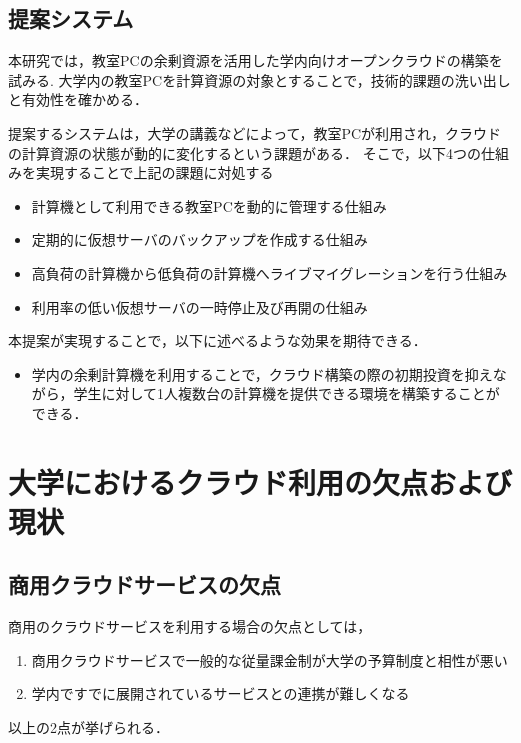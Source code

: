\documentclass[11pt,a4paper]{jsarticle}
\begin{document}
\subsection{提案システム}
本研究では，教室PCの余剰資源を活用した学内向けオープンクラウドの構築を試みる.
大学内の教室PCを計算資源の対象とすることで，技術的課題の洗い出しと有効性を確かめる．
\par 提案するシステムは，大学の講義などによって，教室PCが利用され，クラウドの計算資源の状態が動的に変化するという課題がある．
そこで，以下4つの仕組みを実現することで上記の課題に対処する
\begin{itemize}
	\item 計算機として利用できる教室PCを動的に管理する仕組み
	\item 定期的に仮想サーバのバックアップを作成する仕組み
	\item 高負荷の計算機から低負荷の計算機へライブマイグレーションを行う仕組み
	\item 利用率の低い仮想サーバの一時停止及び再開の仕組み
\end{itemize}

\par 本提案が実現することで，以下に述べるような効果を期待できる．
\begin{itemize}
	\item 学内の余剰計算機を利用することで，クラウド構築の際の初期投資を抑えながら，学生に対して1人複数台の計算機を提供できる環境を構築することができる．
\end{itemize}


\section{大学におけるクラウド利用の欠点および現状}
\subsection{商用クラウドサービスの欠点}
商用のクラウドサービスを利用する場合の欠点としては，
\begin{enumerate}
	\item 商用クラウドサービスで一般的な従量課金制が大学の予算制度と相性が悪い
	\item 学内ですでに展開されているサービスとの連携が難しくなる
\end{enumerate}
以上の2点が挙げられる．
\end{document}
